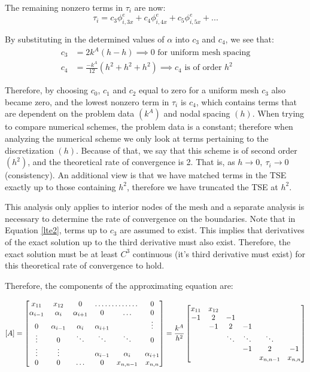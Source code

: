\documentclass[letterpaper, 10pt, oneside]{article}
\newcommand{\be}{\begin{equation}}
\newcommand{\ee}{\end{equation}}
\newcommand{\as}[1]{\begin{align*}#1\end{align*}}
\begin{document}
The remaining nonzero terms in $\tau_i$ are now:
\be	\tau_i = c_3 \phi^e_{i,3x} + c_4 \phi^e_{i,4x} +c_5 \phi^e_{i,5x} + ...\label{lte3}\ee

By substituting in the determined values of $\alpha$ into $c_3$ and $c_4$, we see that:
\as{
	c_3 &= 2k^A(h - h) \implies 0 \text{ for uniform mesh spacing} \\
	c_4 &= \frac{-k^A}{12}\left( h^2 + h^2 + h^2 \right) \implies c_4 \text{ is of order } h^2}
 
 Therefore, by choosing $c_0$, $c_1$ and $c_2$ equal to zero for a uniform mesh $c_3$ also became zero, and the lowest nonzero term in $\tau_i$ is $c_4$, which contains terms that are dependent on the problem data $(k^A)$ and nodal spacing $(h)$.  When trying to compare numerical schemes, the problem data is a constant; therefore when analyzing the numerical scheme we only look at terms pertaining to the discretization $(h)$.  Because of that, we say that this scheme is of second order $(h^2)$, and the theoretical rate of convergence is 2.  That is, as $h \rightarrow 0, \ \tau_i \rightarrow 0$ (consistency).  An additional view is that we have matched terms in the TSE exactly up to those containing $h^2$, therefore we have truncated the TSE at $h^2$.

 This analysis only applies to interior nodes of the mesh and a separate analysis is necessary to determine the rate of convergence on the boundaries. Note that in Equation \ref{lte2}, terms up to $c_3$ are assumed to exist.  This implies that derivatives of the exact solution up to the third derivative must also exist.  Therefore, the exact solution must be at least $C^3$ continuous (it's third derivative must exist) for this theoretical rate of convergence to hold.

Therefore, the components of the approximating equation are:

\[ [A] =
	\begin{bmatrix}
		x_{11}			&x_{12} 		&	 0			&\hdotsfor{2} 					&0\\
		\alpha_{i-1} 	&\alpha_{i} 	& \alpha_{i+1} 	& 0	 			&\hdots 		&0\\
		0 				&\alpha_{i-1} 	& \alpha_{i} 	& \alpha_{i+1} 	&				&\vdots\\
		\vdots			&0				& \ddots		& \ddots		& \ddots		&0\\	
		\vdots			&\vdots			&				&\alpha_{i-1} 	& \alpha_{i} 	& \alpha_{i+1}\\		
		0				&0				& \hdots		&0				&x_{n,n-1}		&x_{n,n}\\
	\end{bmatrix}
	= \frac{k^A}{h^2}
	\begin{bmatrix}
		x_{11}	&x_{12} &		&		&			&\\
		-1		&2		& -1	&	 	&			&\\
		 		&-1		&2		& -1	&			&\\
				&		& \ddots& \ddots& \ddots	&\\	
				&		&		&-1		& 2			& -1\\		
				& 		&		&		&x_{n,n-1}	&x_{n,n}\\
	\end{bmatrix}
\]
\end{document}

